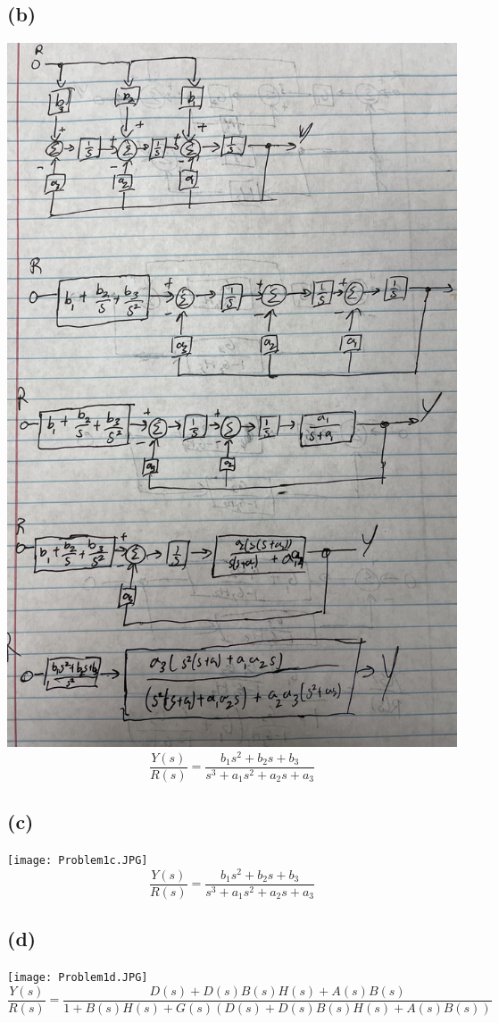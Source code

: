 \documentclass[12pt]{article}
\begin{document}
\subsection*{(b)}
\includegraphics[scale=0.4,angle=270,origin=c]{Problem1b.JPG}
\FloatBarrier
$$\frac{Y(s)}{R(s)}=\boxed{\frac{b_1s^2+b_2s+b_3}{s^3+a_1s^2+a_2s+a_3}}$$
\subsection*{(c)}
\texttt{[image: Problem1c.JPG]}
\FloatBarrier
$$\frac{Y(s)}{R(s)}=\boxed{\frac{b_1s^2+b_2s+b_3}{s^3+a_1s^2+a_2s+a_3}}$$
\subsection*{(d)}
\texttt{[image: Problem1d.JPG]}
\FloatBarrier
$$\frac{Y(s)}{R(s)}=\boxed{\frac{D(s)+D(s)B(s)H(s)+A(s)B(s)}
{1+B(s)H(s)+G(s)(D(s)+D(s)B(s)H(s)+A(s)B(s))}}$$
\end{document}
